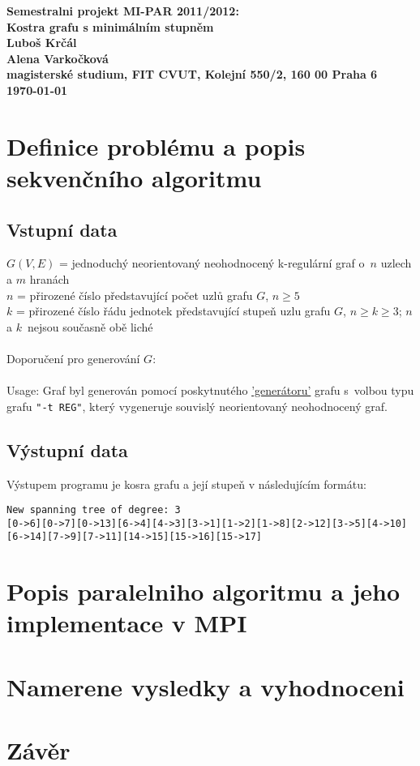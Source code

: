 \documentclass[]{article}
\begin{document}
\begin{center}
\bf Semestralni projekt MI-PAR 2011/2012:\\[5mm]
    Kostra grafu s minimálním stupněm\\[5mm] 
       Luboš Krčál\\
       Alena Varkočková\\[2mm]
magisterské studium, FIT CVUT, Kolejní 550/2, 160 00 Praha 6\\[2mm]
\today
\end{center}

\section{Definice problému a popis sekvenčního algoritmu}

\subsection{Vstupní data}
$G(V,E)$ = jednoduchý neorientovaný neohodnocený k-regulární graf o~$n$ uzlech a $m$ hranách\\
$n$ = přirozené číslo představující počet uzlů grafu $G$, $n \geq 5$\\
$k$ = přirozené číslo řádu jednotek představující stupeň uzlu grafu $G$, $n \geq k \geq 3$; $n$ a $k$~nejsou současně obě liché\\
\\
Doporučení pro generování $G$:\\
\\
Usage: Graf byl generován pomocí poskytnutého \href{''https://edux.fit.cvut.cz/courses/MI-PAR/labs/zadani_semestralnich_praci/generator_grafu'}{'generátoru'} grafu s~volbou typu grafu \texttt{"-t REG"}, který vygeneruje souvislý neorientovaný neohodnocený graf.

\subsection{Výstupní data}
Výstupem programu je kosra grafu a její stupeň v následujícím formátu:

\begin{verbatim}
New spanning tree of degree: 3
[0->6][0->7][0->13][6->4][4->3][3->1][1->2][1->8][2->12][3->5][4->10][6->14][7->9][7->11][14->15][15->16][15->17]
\end{verbatim}

\section{Popis paralelniho algoritmu a jeho implementace v MPI}

\section{Namerene vysledky a vyhodnoceni}

\section{Závěr}
\end{document}
